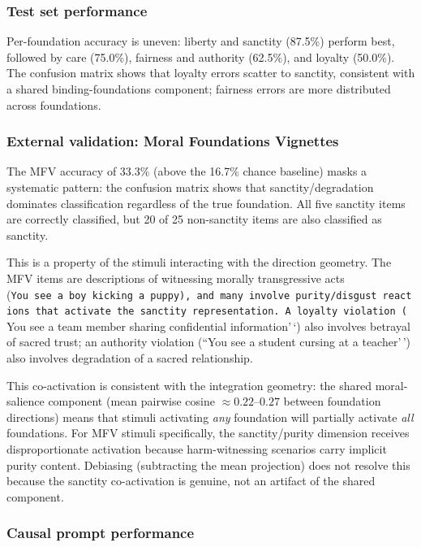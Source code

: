 \subsubsection{Test set performance}\label{test-set-performance}

Per-foundation accuracy is uneven: liberty and sanctity (87.5\%) perform best, followed by care (75.0\%), fairness and authority (62.5\%), and loyalty (50.0\%).
The confusion matrix shows that loyalty errors scatter to sanctity, consistent with a shared binding-foundations component; fairness errors are more distributed across foundations.

\subsubsection{External validation: Moral Foundations Vignettes}\label{external-validation-moral-foundations-vignettes}

The MFV accuracy of 33.3\% (above the 16.7\% chance baseline) masks a systematic pattern: the confusion matrix shows that sanctity/degradation dominates classification regardless of the true foundation.
All five sanctity items are correctly classified, but 20 of 25 non-sanctity items are also classified as sanctity.

This is a property of the stimuli interacting with the direction geometry.
The MFV items are descriptions of witnessing morally transgressive acts (\texttt{You\ see\ a\ boy\ kicking\ a\ puppy\textquotesingle{}\textquotesingle{}),\ and\ many\ involve\ purity/disgust\ reactions\ that\ activate\ the\ sanctity\ representation.\ A\ loyalty\ violation\ (}You see a team member sharing confidential information'\,`) also involves betrayal of sacred trust; an authority violation (``You see a student cursing at a teacher'\,') also involves degradation of a sacred relationship.

This co-activation is consistent with the integration geometry: the shared moral-salience component (mean pairwise cosine \(\approx 0.22\)--\(0.27\) between foundation directions) means that stimuli activating \emph{any} foundation will partially activate \emph{all} foundations.
For MFV stimuli specifically, the sanctity/purity dimension receives disproportionate activation because harm-witnessing scenarios carry implicit purity content.
Debiasing (subtracting the mean projection) does not resolve this because the sanctity co-activation is genuine, not an artifact of the shared component.

\subsubsection{Causal prompt performance}\label{causal-prompt-performance}

